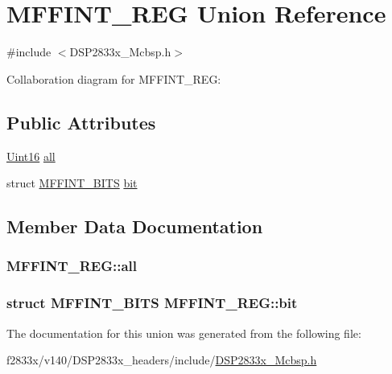 \hypertarget{union_m_f_f_i_n_t___r_e_g}{}\section{M\+F\+F\+I\+N\+T\+\_\+\+R\+E\+G Union Reference}
\label{union_m_f_f_i_n_t___r_e_g}


{\ttfamily \#include $<$D\+S\+P2833x\+\_\+\+Mcbsp.\+h$>$}



Collaboration diagram for M\+F\+F\+I\+N\+T\+\_\+\+R\+E\+G\+:
\subsection*{Public Attributes}
\begin{DoxyCompactItemize}
\item 
\hyperlink{_d_s_p2833x___device_8h_a59a9f6be4562c327cbfb4f7e8e18f08b}{Uint16} \hyperlink{union_m_f_f_i_n_t___r_e_g_af6607d10da16d7ec763ebddcd59829db}{all}
\item 
struct \hyperlink{struct_m_f_f_i_n_t___b_i_t_s}{M\+F\+F\+I\+N\+T\+\_\+\+B\+I\+T\+S} \hyperlink{union_m_f_f_i_n_t___r_e_g_a8c5406148bf6abc79ca3d0695267ebb8}{bit}
\end{DoxyCompactItemize}


\subsection{Member Data Documentation}
\hypertarget{union_m_f_f_i_n_t___r_e_g_af6607d10da16d7ec763ebddcd59829db}{}
\subsubsection[{all}]{ M\+F\+F\+I\+N\+T\+\_\+\+R\+E\+G\+::all}\label{union_m_f_f_i_n_t___r_e_g_af6607d10da16d7ec763ebddcd59829db}
\hypertarget{union_m_f_f_i_n_t___r_e_g_a8c5406148bf6abc79ca3d0695267ebb8}{}
\subsubsection[{bit}]{\setlength{\rightskip}{0pt plus 5cm}struct {\bf M\+F\+F\+I\+N\+T\+\_\+\+B\+I\+T\+S} M\+F\+F\+I\+N\+T\+\_\+\+R\+E\+G\+::bit}\label{union_m_f_f_i_n_t___r_e_g_a8c5406148bf6abc79ca3d0695267ebb8}


The documentation for this union was generated from the following file\+:\begin{DoxyCompactItemize}
\item 
f2833x/v140/\+D\+S\+P2833x\+\_\+headers/include/\hyperlink{_d_s_p2833x___mcbsp_8h}{D\+S\+P2833x\+\_\+\+Mcbsp.\+h}\end{DoxyCompactItemize}
